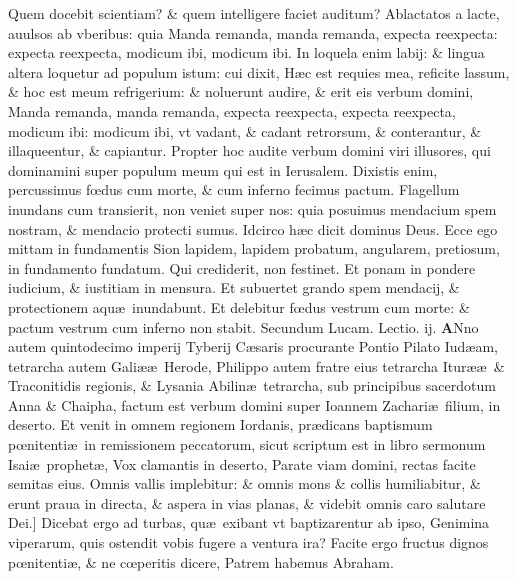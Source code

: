 \documentclass[a5paper,10pt]{book}
\def\rightmarginnote{%
	\lrmarginnote{\hskip\columnwidth \hskip -1em}}
\def\ae{æ}
\def\oe{œ}
\begin{document}
\begin{multicols*}{2}
Quem docebit scientiam? \& quem intelligere faciet auditum?
Ablactatos a lacte, auulsos ab vberibus: quia Manda remanda, manda remanda, expecta reexpecta: expecta reexpecta, modicum ibi, modicum ibi.
In loquela enim labij: \& lingua altera loquetur ad populum istum: cui dixit, H\ae c est requies mea, reficite lassum, \& hoc est meum refrigerium: \& noluerunt audire, \& erit eis verbum domini, Manda remanda, manda remanda, expecta reexpecta, expecta reexpecta, modicum ibi: modicum ibi, vt vadant, \& cadant retrorsum, \& conterantur, \& illaqueentur, \& capiantur.
Propter hoc audite verbum domini viri illusores, qui dominamini super populum meum qui est in Ierusalem.
Dixistis enim, percussimus f\oe dus cum morte, \& cum inferno fecimus pactum.
Flagellum inundans cum transierit, non veniet super nos: quia posuimus mendacium spem nostram, \& mendacio protecti sumus.
Idcirco h\ae c dicit dominus Deus. Ecce ego mittam in fundamentis Sion lapidem,
lapidem probatum, angularem, pretiosum, in fundamento fundatum.
Qui crediderit, non festinet. Et ponam in pondere iudicium, \& iustitiam in mensura. Et subuertet grando spem mendacij, \& protectionem aqu\ae \ inundabunt.
Et delebitur f\oe dus vestrum cum morte: \& pactum vestrum cum inferno non stabit.
\fancyhead[C]{\color{red} Sabbato Dominic\ae . j. aduentus}
\color{red} Secundum Lucam. Lectio. ij. \color{black}
\vspace{-.25em}
\lettrine[lines=2]{\bfseries \color{red} A}{}\textdagger Nno\rightmarginnote{c.3.a} autem quintodecimo imperij Tyberij C\ae saris procurante Pontio Pilato Iud\ae am, tetrarcha autem Gali\ae \ae \ Herode, Philippo autem fratre eius tetrarcha Itur\ae \ae \ \& Traconitidis regionis, \& Lysania Abilin\ae \ tetrarcha, sub principibus sacerdotum Anna \& Chaipha, factum est verbum domini super Ioannem Zachari\ae \ filium, in deserto.
Et venit in omnem regionem Iordanis, pr\ae dicans baptismum p\oe nitenti\ae \ in remissionem peccatorum, sicut scriptum est in libro sermonum Isai\ae \ prophet\ae , Vox clamantis in deserto, Parate viam domini, rectas facite semitas eius.
Omnis vallis implebitur: \& omnis mons \& collis humiliabitur, \& erunt praua in directa, \& aspera in vias planas, \& videbit omnis caro salutare Dei.]
Dicebat\rightmarginnote{B} ergo ad turbas, qu\ae \ exibant vt baptizarentur ab ipso, Genimina viperarum, quis ostendit vobis fugere a ventura ira?
Facite ergo fructus dignos p\oe nitenti\ae , \& ne c\oe peritis dicere, Patrem habemus Abraham.

\end{multicols*}
\end{document}
